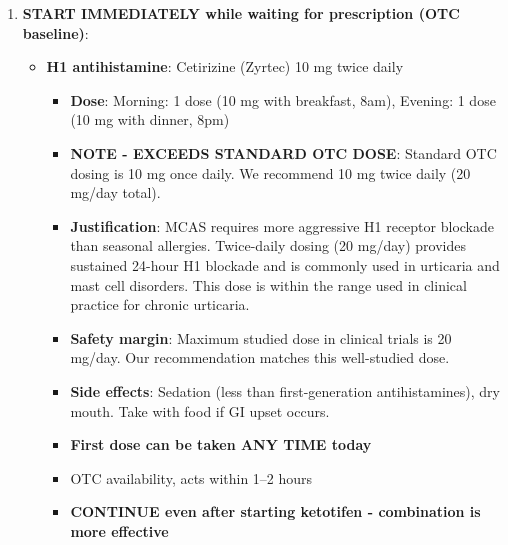 \begin{enumerate}
    \item \textbf{START IMMEDIATELY while waiting for prescription (OTC baseline)}:
    \begin{itemize}
        \item \textbf{H1 antihistamine}: Cetirizine (Zyrtec) 10 mg twice daily
        \begin{itemize}
            \item \textbf{Dose}: Morning: 1 dose (10 mg with breakfast, 8am), Evening: 1 dose (10 mg with dinner, 8pm)
            \item \textbf{NOTE - EXCEEDS STANDARD OTC DOSE}: Standard OTC dosing is 10 mg once daily. We recommend 10 mg twice daily (20 mg/day total).
            \item \textbf{Justification}: MCAS requires more aggressive H1 receptor blockade than seasonal allergies. Twice-daily dosing (20 mg/day) provides sustained 24-hour H1 blockade and is commonly used in urticaria and mast cell disorders. This dose is within the range used in clinical practice for chronic urticaria.
            \item \textbf{Safety margin}: Maximum studied dose in clinical trials is 20 mg/day. Our recommendation matches this well-studied dose.
            \item \textbf{Side effects}: Sedation (less than first-generation antihistamines), dry mouth. Take with food if GI upset occurs.
            \item \textbf{First dose can be taken ANY TIME today}
            \item OTC availability, acts within 1--2 hours
            \item \textbf{CONTINUE even after starting ketotifen - combination is more effective}
        \end{itemize}


\end{itemize}
\end{enumerate}
